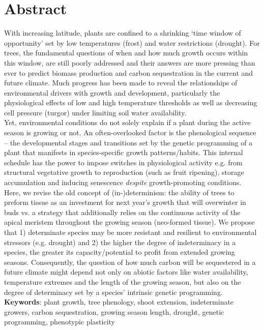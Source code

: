\documentclass{article}
\begin{document}
	
\section*{Abstract} %
		With increasing latitude, plants are confined to a shrinking ‘time window of opportunity’ set by low temperatures (frost) and water restrictions (drought). For trees, the fundamental questions of when and how much growth occurs within this window, are still poorly addressed and their answers are more pressing than ever to predict biomass production and carbon sequestration in the current and future climate. Much progress has been made to reveal the relationships of environmental drivers with growth and development, particularly the physiological effects of low and high temperature thresholds as well as decreasing cell pressure (turgor) under limiting soil water availability. \\
		Yet, environmental conditions do not solely explain if a plant during the active season is growing or not. An often-overlooked factor is the phenological sequence – the developmental stages and transitions set by the genetic programming of a plant that manifests in species-specific growth patterns/habits. This internal schedule has the power to impose switches in physiological activity e.g. from structural vegetative growth to reproduction (such as fruit ripening), storage accumulation and inducing senescence \textit{despite} growth-promoting conditions.\\
		Here, we revise the old concept of (in-)determinism: the ability of trees to preform tissue as an investment for next year’s growth that will overwinter in buds vs. a strategy that additionally relies on the continuous activity of the apical meristem throughout the growing season (neo-formed tissue). We propose that 1) determinate species may be more resistant and resilient to environmental stressors (e.g. drought) and 2) the higher the degree of indeterminacy in a species, the greater its capacity/potential to profit from extended growing seasons. Consequently, the question of how much carbon will be sequestered in a future climate might depend not only on abiotic factors like water availability, temperature extremes and the length of the growing season, but also on the degree of determinacy set by a species' intrinsic genetic programming.\\
		
			\textbf{Keywords}: plant growth, tree phenology, shoot extension, indeterminate growers, carbon sequestration, growing season length, drought, genetic programming, phenotypic plasticity
			\newpage
			
\end{document}
